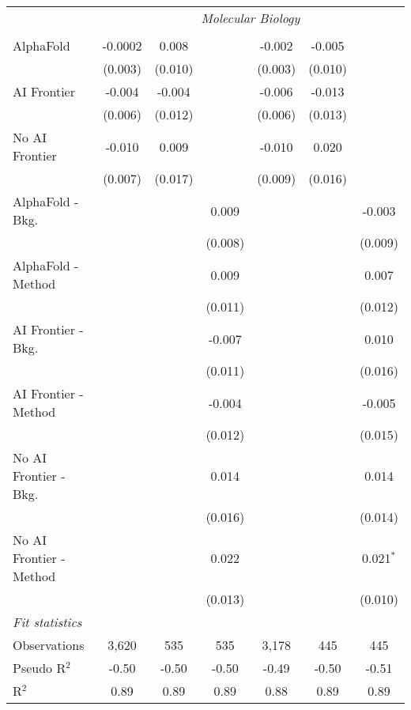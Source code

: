 \begin{tabular}{lcccccc}
 & \multicolumn{6}{c}{\textit{Molecular Biology}} \\ \\
   AlphaFold               & -0.0002 & 0.008   &         & -0.002  & -0.005  &   \\   
                           & (0.003) & (0.010) &         & (0.003) & (0.010) &   \\   
   AI Frontier             & -0.004  & -0.004  &         & -0.006  & -0.013  &   \\   
                           & (0.006) & (0.012) &         & (0.006) & (0.013) &   \\   
   No AI Frontier          & -0.010  & 0.009   &         & -0.010  & 0.020   &   \\   
                           & (0.007) & (0.017) &         & (0.009) & (0.016) &   \\   
   AlphaFold - Bkg.        &         &         & 0.009   &         &         & -0.003\\   
                           &         &         & (0.008) &         &         & (0.009)\\   
   AlphaFold - Method      &         &         & 0.009   &         &         & 0.007\\   
                           &         &         & (0.011) &         &         & (0.012)\\   
   AI Frontier - Bkg.      &         &         & -0.007  &         &         & 0.010\\   
                           &         &         & (0.011) &         &         & (0.016)\\   
   AI Frontier - Method    &         &         & -0.004  &         &         & -0.005\\   
                           &         &         & (0.012) &         &         & (0.015)\\   
   No AI Frontier - Bkg.   &         &         & 0.014   &         &         & 0.014\\   
                           &         &         & (0.016) &         &         & (0.014)\\   
   No AI Frontier - Method &         &         & 0.022   &         &         & 0.021$^{*}$\\   
                           &         &         & (0.013) &         &         & (0.010)\\   
   \midrule
   \emph{Fit statistics}\\
   Observations            & 3,620   & 535     & 535     & 3,178   & 445     & 445\\  
   Pseudo R$^2$            & -0.50   & -0.50   & -0.50   & -0.49   & -0.50   & -0.51\\  
   R$^2$                   & 0.89    & 0.89    & 0.89    & 0.88    & 0.89    & 0.89\\  
   

\end{tabular}
